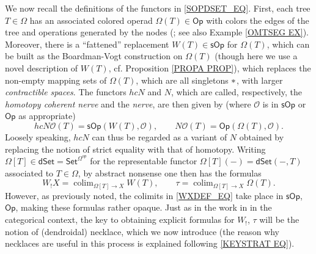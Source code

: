 \documentclass{hha}
\theoremstyle{definition} %
\newcommand{\Op}{\mathsf{Op}}
\newcommand{\sOp}{\mathsf{sOp}}
\DeclareMathOperator{\colim}{colim}
\renewcommand{\O}{\mathcal O}
\begin{document}
We now recall the definitions of the functors in
\eqref{SOPDSET_EQ}.
First, each tree $T \in \Omega$
has an associated colored operad
$\Omega(T) \in \mathsf{Op}$
with colors the edges of the tree and 
operations generated by the nodes
(\cite[\S 3]{MW07}; see also Example \ref{OMTSEG EX}).
Moreover, there is a ``fattened'' replacement 
$W(T) \in \sOp$ for $\Omega(T)$,
which can be built \cite[Rem. 7.3]{MW09}
as the Boardman-Vogt construction on $\Omega(T)$
(though here we use a novel description of $W(T)$,
cf. Proposition \ref{PROPA PROP}),
which replaces the non-empty mapping sets of 
$\Omega(T)$, which are all singletons $\**$,
with larger \emph{contractible spaces}.
The functors $hcN$ and $N$,
which are called, respectively,
the \emph{homotopy coherent nerve}
and the \emph{nerve},
are then given by (where $\O$ is in $\sOp$ or $\Op$ as appropriate)
\begin{equation}\label{TWONER EQ}
	hcN \O(T) = \sOp(W(T),\O),
	\qquad
	N \O(T) = \Op(\Omega(T),\O).
\end{equation}
Loosely speaking, $hcN$ can thus be regarded as a variant of $N$
obtained by replacing the notion of strict equality with that of homotopy.
Writing 
$\Omega[T]\in \mathsf{dSet} = \mathsf{Set}^{\Omega^{op}}$
for the representable functor
$\Omega[T](-) = \mathsf{dSet}(-,T)$
associated to $T \in \Omega$,
by abstract nonsense one then has the formulas
\begin{equation}\label{WXDEF_EQ}
	W_!X = \colim_{\Omega[T] \to X} W(T),
\qquad
	\tau = \colim_{\Omega[T] \to X} \Omega(T).
\end{equation}
However, as previously noted, 
the colimits in \eqref{WXDEF_EQ}
take place in $\sOp$, $\Op$,
making these formulas rather opaque.
Just as in the work in \cite{DS11} in the categorical context,
the key to obtaining explicit formulas for
$W_!$, $\tau$ will be the notion of (dendroidal) necklace,
which we now introduce
(the reason why necklaces are useful in this process is explained following \eqref{KEYSTRAT EQ}).
\end{document}

